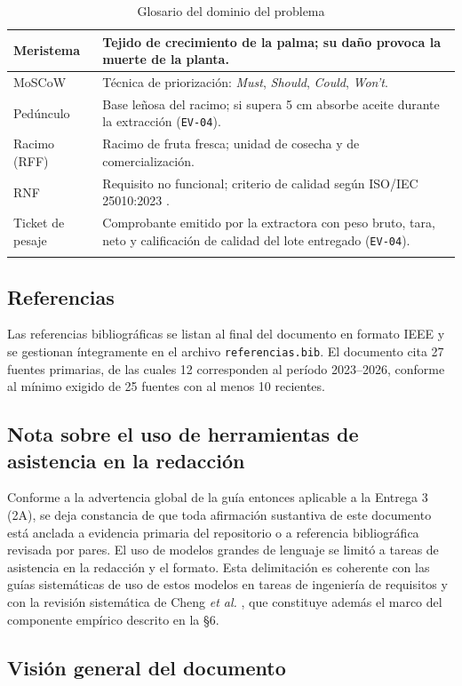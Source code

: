 \documentclass[11pt,a4paper]{article}
\newcommand{\id}[1]{\texttt{\begingroup\hyphenpenalty=10000\relax#1\endgroup}}
\renewcommand{\id}[1]{\texttt{#1}}
\begin{document}
\begin{longtable}{|L{3.6cm}|L{11.8cm}|}
Meristema & Tejido de crecimiento de la palma; su daño provoca la muerte de la planta. \\ \hline
MoSCoW & Técnica de priorización: \emph{Must}, \emph{Should}, \emph{Could}, \emph{Won't}. \\ \hline
Pedúnculo & Base leñosa del racimo; si supera 5 cm absorbe aceite durante la extracción (\id{EV-04}). \\ \hline
Racimo (RFF) & Racimo de fruta fresca; unidad de cosecha y de comercialización. \\ \hline
RNF & Requisito no funcional; criterio de calidad según ISO/IEC 25010:2023 \cite{iso25010}. \\ \hline
Ticket de pesaje & Comprobante emitido por la extractora con peso bruto, tara, neto y calificación de calidad del lote entregado (\id{EV-04}). \\ \hline
\caption{Glosario del dominio del problema}
\end{longtable}

\subsection{Referencias}

Las referencias bibliográficas se listan al final del documento en formato IEEE y se gestionan
íntegramente en el archivo \id{referencias.bib}. El documento cita 27 fuentes primarias, de las
cuales 12 corresponden al período 2023--2026, conforme al mínimo exigido de 25 fuentes con al
menos 10 recientes.

\subsection{Nota sobre el uso de herramientas de asistencia en la redacción}

Conforme a la advertencia global de la guía entonces aplicable a la Entrega 3 (2A), se deja constancia de que toda
afirmación sustantiva de este documento está anclada a evidencia primaria del repositorio o a
referencia bibliográfica revisada por pares. El uso de modelos grandes de lenguaje se limitó a
tareas de asistencia en la redacción y el formato. Esta delimitación es coherente con las guías
sistemáticas de uso de estos modelos en tareas de ingeniería de requisitos
\cite{vogelsang2024,arora2024} y con la revisión sistemática de Cheng \emph{et al.}
\cite{cheng2026}, que constituye además el marco del componente empírico descrito en la §6.

\subsection{Visión general del documento}
\end{document}
